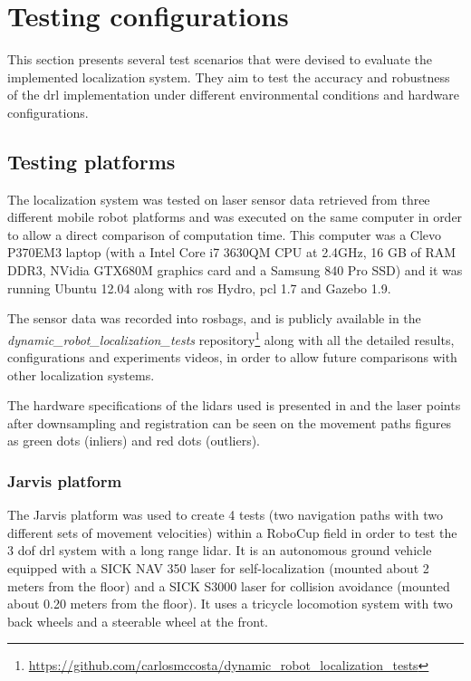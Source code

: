 \section{Testing configurations}\label{sec:testing-configurations}

This section presents several test scenarios that were devised to evaluate the implemented localization system. They aim to test the accuracy and robustness of the \gls{drl} implementation under different environmental conditions and hardware configurations.


\subsection{Testing platforms}

The localization system was tested on laser sensor data retrieved from three different mobile robot platforms and was executed on the same computer in order to allow a direct comparison of computation time. This computer was a Clevo P370EM3 laptop (with a Intel Core i7 3630QM CPU at 2.4GHz, 16 GB of RAM DDR3, NVidia GTX680M graphics card and a Samsung 840 Pro SSD) and it was running Ubuntu 12.04 along with \gls{ros} Hydro, \gls{pcl} 1.7 and Gazebo 1.9.

The sensor data was recorded into rosbags, and is publicly available in the \emph{dynamic\_robot\_localization\_tests} repository\footnote{\url{https://github.com/carlosmccosta/dynamic_robot_localization_tests}} along with all the detailed results, configurations and experiments videos, in order to allow future comparisons with other localization systems.

The hardware specifications of the \glspl{lidar} used is presented in  and the laser points after downsampling and registration can be seen on the movement paths figures as green dots (inliers) and red dots (outliers).


\subsubsection{Jarvis platform}

The Jarvis platform was used to create 4 tests (two navigation paths with two different sets of movement velocities) within a RoboCup field in order to test the 3 \gls{dof} \gls{drl} system with a long range \gls{lidar}. It is an autonomous ground vehicle equipped with a SICK NAV 350 laser for self-localization (mounted about 2 meters from the floor) and a SICK S3000 laser for collision avoidance (mounted about 0.20 meters from the floor). It uses a tricycle locomotion system with two back wheels and a steerable wheel at the front.

